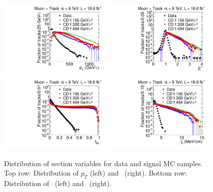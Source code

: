 \begin{figure}
\centering
  \includegraphics[clip=false, trim=0.0cm 0cm 0.0cm 0cm, width=0.48\textwidth]{figures/tkmu/Selection_Comp_8TeV_GMStau_Pt_BS}
  \includegraphics[clip=false, trim=0.0cm 0cm 0.0cm 0cm, width=0.48\textwidth]{figures/tkmu/Selection_Comp_8TeV_GMStau_TOF_BS} \\
  \includegraphics[clip=false, trim=0.0cm 0cm 0.0cm 0cm, width=0.48\textwidth]{figures/tkmu/Selection_Comp_8TeV_GMStau_Is_BS}
  \includegraphics[clip=false, trim=0.0cm 0cm 0.0cm 0cm, width=0.48\textwidth]{figures/tkmu/Selection_Comp_8TeV_GMStau_Im_BS}
  \caption[Distribution of selection variables in the \tktof\ analysis for data and signal MC samples.]
{Distribution of section variables for data and signal MC samples.
Top row: Distribution of $p_T$ (left) and \invbeta\ (right).
Bottom row: Distribution of \ias\ (left) and \ih\ (right).}
    \label{fig:TkMuSelVar}
\end{figure}

